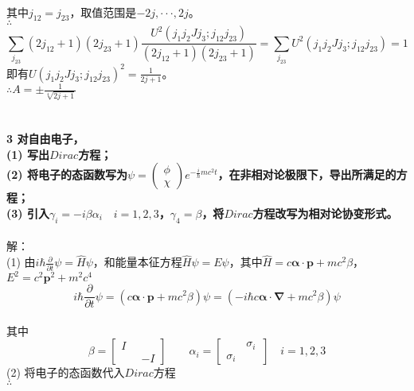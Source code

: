 \documentclass[12pt]{article}
\numberwithin{equation}{section}	 %
\begin{document}
\begin{spacing}{1.5}
\begin{align}
\end{align}
其中$j_{12}=j_{23}$，取值范围是$-2j,\cdot\cdot\cdot,2j$。\\
$\therefore$
\begin{equation}
\sum_{j_{23}}(2j_{12}+1)(2j_{23}+1) \frac{U^{2}(j_{1}j_{2}Jj_{3};j_{12}j_{23})}{(2j_{12}+1)(2j_{23}+1)}=\sum_{j_{23}}U^{2}(j_{1}j_{2}Jj_{3};j_{12}j_{23})=1
\end{equation}
即有$\displaystyle U(j_{1}j_{2}Jj_{3};j_{12}j_{23})^{2} = \frac{1}{2j+1}$。\\
$\therefore \displaystyle A = \pm\frac{1}{\sqrt[4]{2j+1}}$ \\
~\\
~\\

\textbf{3 \quad 对自由电子，\\
(1) 写出$Dirac$方程；\\
(2) 将电子的态函数写为$\displaystyle \psi=\begin{pmatrix} \phi \\ \chi \end{pmatrix}e^{-\frac{i}{\hbar}mc^{2}t}$，在非相对论极限下，导出所满足的方程；\\
(3) 引入$\gamma_{i}=-i\beta\alpha_{i} \quad i=1,2,3$，$\gamma_{4}=\beta$，将$Dirac$方程改写为相对论协变形式。}\\
~\\
解：\\
(1) 由$\displaystyle i\hbar\frac{\partial}{\partial t}\psi = \hat{H}\psi$，和能量本征方程$\hat{H}\psi = E\psi$，其中$\hat{H}=c\bm{\alpha \cdot p} +mc^{2}\beta$，$E^{2}=c^{2}\bm{p}^{2}+m^{2}c^{4}$
\begin{equation}
i\hbar\frac{\partial}{\partial t}\psi = \left(c\bm{\alpha \cdot p} +mc^{2}\beta\right)\psi = \left(-i\hbar c\bm{\alpha \cdot \nabla} +mc^{2}\beta\right)\psi
\end{equation}\\
其中
\begin{equation}
\beta = 
\begin{bmatrix}
I & \quad\\
\quad & -I
\end{bmatrix}
\qquad
\alpha_{i} =
\begin{bmatrix}
\quad & \sigma_{i} \\
\sigma_{i} & \quad
\end{bmatrix} \quad i=1,2,3
\end{equation}
(2) 将电子的态函数代入$Dirac$方程\\
$\therefore$
\begin{equation}

\end{equation}
\end{spacing}
\end{document}
